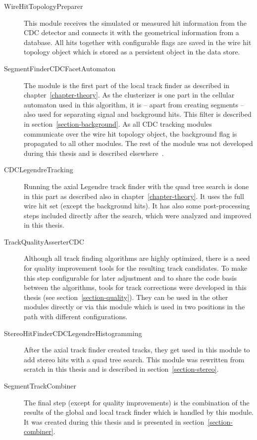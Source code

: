\begin{description}
  \item[Wire\-Hit\-Topology\-Preparer] This module receives the simulated or measured hit information from the CDC detector and connects it with the geometrical information from a database. All hits together with configurable flags are saved in the wire hit topology object which is stored as a persistent object in the data store.
  \item[Segment\-Finder\-CDC\-Facet\-Automaton] The module is the first part of the local track finder as described in chapter~\ref{chapter-theory}. As the clusterizer is one part in the cellular automaton used in this algorithm, it is -- apart from creating segments -- also used for separating signal and background hits. This filter is described in section~\ref{section-background}. As all CDC tracking modules communicate over the wire hit topology object, the background flag is propagated to all other modules. The rest of the module was not developed during this thesis and is described elsewhere~\cite{oliver}.
  \item[CDC\-Legendre\-Tracking] Running the axial Legendre track finder with the quad tree search is done in this part as described also in chapter~\ref{chapter-theory}. It uses the full wire hit set (except the background hits). It has also some post-processing steps included directly after the search, which were analyzed and improved in this thesis.
  \item[Track\-Quality\-Asserter\-CDC] Although all track finding algorithms are highly optimized, there is a need for quality improvement tools for the resulting track candidates. To make this step configurable for later adjustment and to share the code basis between the algorithms, tools for track corrections were developed in this thesis (see section~\ref{section-quality}). They can be used in the other modules directly or via this module which is used in two positions in the path with different configurations.
  \item[Stereo\-Hit\-Finder\-CDC\-Legendre\-Histogramming] After the axial track finder created tracks, they get used in this module to add stereo hits with a quad tree search. This module was rewritten from scratch in this thesis and is described in section~\ref{section-stereo}.
  \item[Segment\-Track\-Combiner] The final step (except for quality improvements) is the combination of the results of the global and local track finder which is handled by this module. It was created during this thesis and is presented in section~\ref{section-combiner}.
\end{description}

